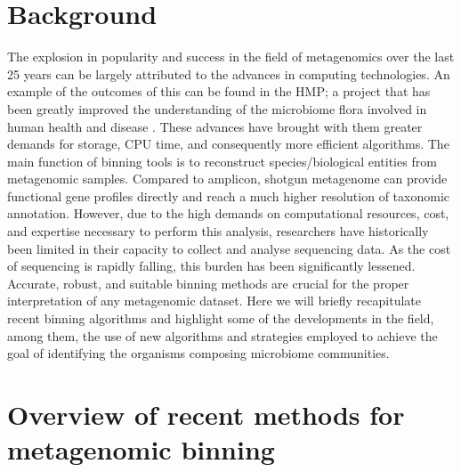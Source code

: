 \documentclass{article}
\begin{document}
\section{Background}
The explosion in popularity and success in the field of metagenomics over the last 25 years can be largely attributed to the advances in computing technologies.
An example of the outcomes of this can be found in the \gls{HMP}; a project that has been greatly improved the understanding of the microbiome flora involved in human health and disease \cite{turnbaugh2007human}.
These advances have brought with them greater demands for storage, \gls{CPU} time, and consequently more efficient algorithms.
The main function of binning tools is to reconstruct species/biological entities from metagenomic samples.  
Compared to amplicon, shotgun metagenome can provide functional gene profiles directly and reach a much higher resolution of taxonomic annotation.
However, due to the high demands on computational resources, cost, and expertise necessary to perform this analysis, researchers have historically been limited in their capacity to collect and analyse sequencing data.
As the cost of sequencing is rapidly falling, this burden has been significantly lessened.
Accurate, robust, and suitable binning methods are crucial for the proper interpretation of any metagenomic dataset.
Here we will briefly recapitulate recent binning algorithms and highlight some of the developments in the field, among them, the use of new algorithms and strategies employed to achieve the goal of identifying the organisms composing microbiome communities.

\section{Overview of recent methods for metagenomic binning}
\end{document}
